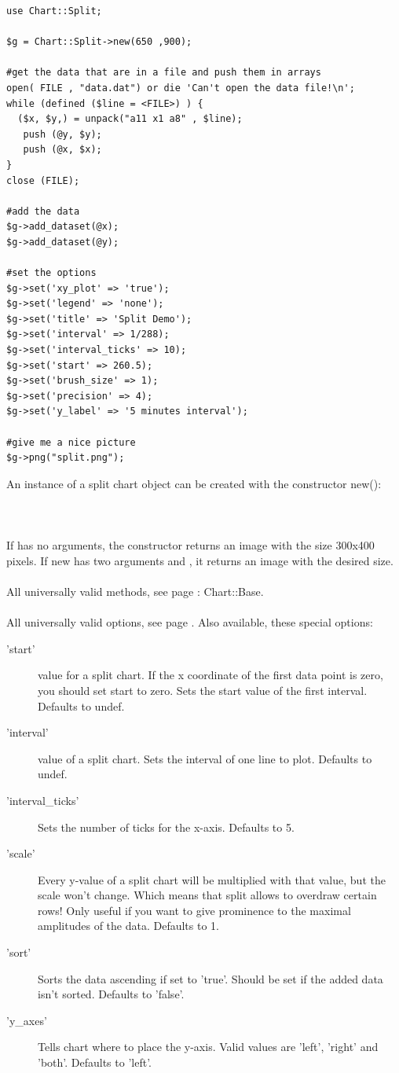 \begin{verbatim}
use Chart::Split;

$g = Chart::Split->new(650 ,900);

#get the data that are in a file and push them in arrays
open( FILE , "data.dat") or die 'Can't open the data file!\n';
while (defined ($line = <FILE>) ) {
  ($x, $y,) = unpack("a11 x1 a8" , $line);
   push (@y, $y);
   push (@x, $x);
}
close (FILE);

#add the data
$g->add_dataset(@x);
$g->add_dataset(@y);

#set the options
$g->set('xy_plot' => 'true');
$g->set('legend' => 'none');
$g->set('title' => 'Split Demo');
$g->set('interval' => 1/288);
$g->set('interval_ticks' => 10);
$g->set('start' => 260.5);
$g->set('brush_size' => 1);
$g->set('precision' => 4);
$g->set('y_label' => '5 minutes interval');

#give me a nice picture
$g->png("split.png");
\end{verbatim}
 An instance of a split chart object can be created with the constructor new():\\
\\
\\
\\
If  has no arguments, the constructor returns an image with the size 300x400 pixels. If new has two arguments  and , it returns an image with the desired size. \\ 
\\ 
All universally valid methods, see page \pageref{methods}: Chart::Base. \\
\\
 All universally valid options, see page \pageref{options}. Also available, these special options:
\begin{description}
\item['start']  value for a split chart. If the x coordinate of the first data point is zero, you should set start to zero. Sets the start value of the first interval. Defaults to undef.
\item['interval']  value of a split chart. Sets the interval of one line to plot. Defaults to undef.
\item['interval\_ticks'] Sets the number of ticks for the x-axis. Defaults to 5.
\item['scale'] Every y-value of a split chart will be multiplied with that value, but the scale won't change. Which means that split allows to overdraw certain rows! Only useful if you want to give prominence to the maximal amplitudes of the data. Defaults to 1.
\item['sort']Sorts the data ascending if set to 'true'. Should be set if the added data isn't sorted. Defaults to 'false'.  
\item['y\_axes'] Tells chart where to place the y-axis. Valid values are 'left', 'right' and 'both'. Defaults to 'left'.
\end{description}